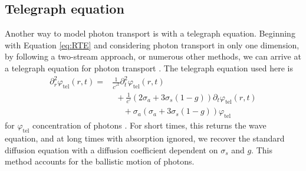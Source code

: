 \documentclass[floatfix,aps,prl,reprint,groupedaddress]{revtex4-2}
\begin{document}
\subsection{Telegraph equation}\label{subsec:teleg} 
Another way to model photon transport is with a telegraph equation. Beginning with Equation \ref{eq:RTE} and considering photon transport in only one dimension, by following a two-stream approach, or numerous other methods, we can arrive at a telegraph equation for photon transport \cite{schuster_radiation_1905,goldstein_diffusion_1951,durian_two-stream_1996,lemieux_diffusing-light_1998,das_non-fickian_1998,dudko_photon_2005,masoliver_solution_1993,masoliver_finite-velocity_1996,weiss_first_1984,weiss_applications_2002}. The telegraph equation used here is
\begin{align}
     \partial_{r}^{2} \varphi_{\textrm{tel}} \left(r,t\right)  = &\frac{1}{c'^{2}}\partial^{2}_{t} \varphi_{\textrm{tel}}\left(r,t\right) \nonumber \\
     &\ \ + \frac{1}{c'}\left(2 \sigma_{a} + 3 \sigma_{s} \left(1-g\right)\right) \partial_{t} \varphi_{\textrm{tel}}\left(r,t\right) \nonumber \\
    &\ \ \ \ \ \ + \sigma_{a}\left(\sigma_{a} + 3 \sigma_{s} \left(1-g\right)\right) \varphi_{\textrm{tel}} \label{eq:tel}
\end{align}
for $\varphi_{\textrm{tel}}$ concentration of photons \cite{lemieux_diffusing-light_1998}. For short times, this returns the wave equation, and at long times with absorption ignored, we recover the standard diffusion equation with a diffusion coefficient dependent on $\sigma_{s}$ and $g$. This method accounts for the ballistic motion of photons.
\end{document}
